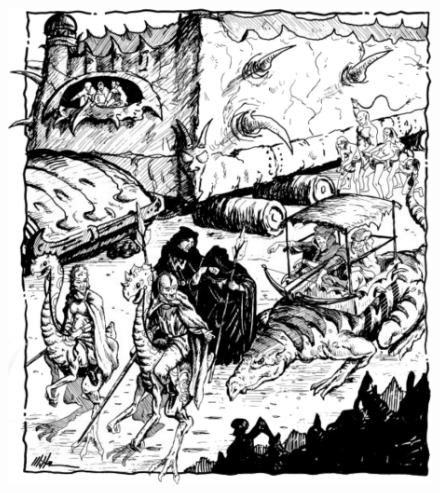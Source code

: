 \begin{figure}[t!]
\centering
\includegraphics[width=\textwidth-15mm]{images/caravan-3.png}
\end{figure}

